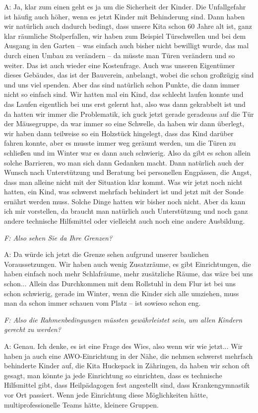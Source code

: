 A: Ja, klar zum einen geht es ja um die Sicherheit der Kinder. Die Unfallgefahr ist häufig auch höher, wenn es jetzt Kinder mit Behinderung sind. Dann haben wir natürlich auch dadurch bedingt, dass unsere Kita schon 60 Jahre alt ist, ganz klar räumliche Stolperfallen, wir haben zum Beispiel Türschwellen und bei dem Ausgang in den Garten -- was einfach auch bisher nicht bewilligt wurde, das mal durch einen Umbau zu verändern -- da müsste man Türen verändern und so weiter. Das ist auch wieder eine Kostenfrage. Auch was unseren Eigentümer dieses Gebäudes, das ist der Bauverein, anbelangt, wobei die schon großzügig sind und uns viel spenden. Aber das sind natürlich schon Punkte, die dann immer nicht so einfach sind. Wir hatten mal ein Kind, das schlecht laufen konnte und das Laufen eigentlich bei uns erst gelernt hat, also was dann gekrabbelt ist und da hatten wir immer die Problematik, ich guck jetzt gerade geradeaus auf die Tür der Mäusegruppe, da war immer so eine Schwelle, da haben wir dann überlegt, wir haben dann teilweise so ein Holzstück hingelegt, dass das Kind darüber fahren konnte, aber es musste immer weg geräumt werden, um die Türen zu schließen und im Winter war es dann auch schwierig. Also da gibt es schon allein solche Barrieren, wo man sich dann Gedanken macht. Dann natürlich auch der Wunsch nach Unterstützung und Beratung bei personellen Engpässen, die Angst, dass man alleine nicht mit der Situation klar kommt. Was wir jetzt noch nicht hatten, ein Kind, was schwerst mehrfach behindert ist und jetzt mit der Sonde ernährt werden muss. Solche Dinge hatten wir bisher noch nicht. Aber da kann ich mir vorstellen, da braucht man natürlich auch Unterstützung und noch ganz andere technische Hilfsmittel oder vielleicht auch noch eine andere Ausbildung. 

\emph{F: Also sehen Sie da Ihre Grenzen?}

A: Da würde ich jetzt die Grenze sehen aufgrund unserer baulichen Voraussetzungen. Wir haben auch wenig Zusatzräume, es gibt Einrichtungen, die haben einfach noch mehr Schlafräume, mehr zusätzliche Räume, das wäre bei uns schon... Allein das Durchkommen mit dem Rollstuhl in dem Flur ist bei uns schon schwierig, gerade im Winter, wenn die Kinder sich alle umziehen, muss man da schon immer schauen vom Platz -- ist sowieso schon eng. 

\emph{F: Also die Rahmenbedingungen müssten gewährleistet sein, um allen Kindern gerecht zu werden?}

A: Genau. Ich denke, es ist eine Frage des Wies, also wenn wir wie jetzt... Wir haben ja auch eine AWO-Einrichtung in der Nähe, die nehmen schwerst mehrfach behinderte Kinder auf, die Kita Huckepack in Zähringen, da haben wir schon oft gesagt, man könnte ja jede Einrichtung so einrichten, dass es technische Hilfsmittel gibt, dass Heilpädagogen fest angestellt sind, dass Krankengymnastik vor Ort passiert. Wenn jede Einrichtung diese Möglichkeiten hätte, multiprofessionelle Teams hätte, kleinere Gruppen. 

